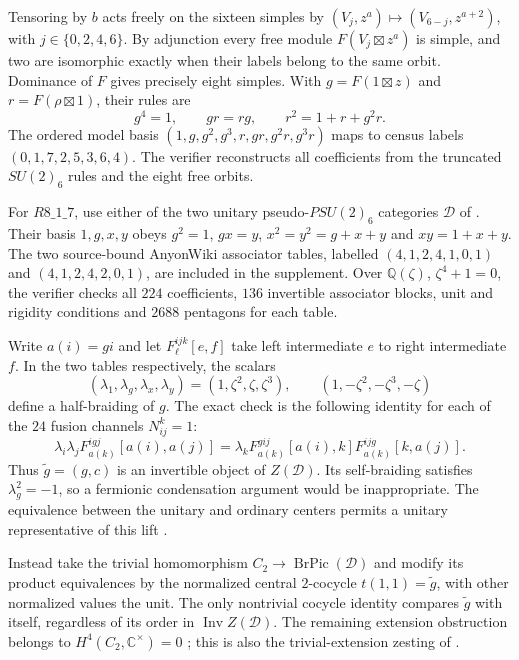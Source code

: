 \documentclass[11pt,reqno]{amsart}
\theoremstyle{definition}
\theoremstyle{remark}
\newcommand{\C}{\mathbb C}
\newcommand{\Q}{\mathbb Q}
\begin{document}
Tensoring by $b$ acts freely on the sixteen simples by $(V_j,z^a)\mapsto(V_{6-j},z^{a+2})$, with $j\in\{0,2,4,6\}$. By adjunction every free module $F(V_j\boxtimes z^a)$ is simple, and two are isomorphic exactly when their labels belong to the same orbit. Dominance of $F$ gives precisely eight simples. With $g=F(1\boxtimes z)$ and $r=F(\rho\boxtimes1)$, their rules are
\[
g^4=1,\qquad gr=rg,\qquad r^2=1+r+g^2r.
\]
The ordered model basis $(1,g,g^2,g^3,r,gr,g^2r,g^3r)$ maps to census labels $(0,1,7,2,5,3,6,4)$. The verifier reconstructs all coefficients from the truncated $SU(2)_6$ rules and the eight free orbits.


For $R8\_1\_7$, use either of the two unitary pseudo-$PSU(2)_6$ categories $\mathcal D$ of \cite[Theorem~4.1]{EIP}. Their basis $1,g,x,y$ obeys $g^2=1$, $gx=y$, $x^2=y^2=g+x+y$ and $xy=1+x+y$. The two source-bound AnyonWiki associator tables, labelled $(4,1,2,4,1,0,1)$ and $(4,1,2,4,2,0,1)$, are included in the supplement. Over $\Q(\zeta)$, $\zeta^4+1=0$, the verifier checks all $224$ coefficients, $136$ invertible associator blocks, unit and rigidity conditions and $2688$ pentagons for each table.

Write $a(i)=gi$ and let $F^{ijk}_\ell[e,f]$ take left intermediate $e$ to right intermediate $f$. In the two tables respectively, the scalars
\[
(\lambda_1,\lambda_g,\lambda_x,\lambda_y)
=(1,\zeta^2,\zeta,\zeta^3),\qquad
(1,-\zeta^2,-\zeta^3,-\zeta)
\]
define a half-braiding of $g$. The exact check is the following identity for each of the $24$ fusion channels $N_{ij}^k=1$:
\[
\lambda_i\lambda_j F^{igj}_{a(k)}[a(i),a(j)]
=\lambda_k F^{gij}_{a(k)}[a(i),k]F^{ijg}_{a(k)}[k,a(j)].
\]
Thus $\widetilde g=(g,c)$ is an invertible object of $Z(\mathcal D)$. Its self-braiding satisfies $\lambda_g^2=-1$, so a fermionic condensation argument would be inappropriate. The equivalence between the unitary and ordinary centers permits a unitary representative of this lift \cite[corrected Remark~3.1]{GalindoUnitary}.

Instead take the trivial homomorphism $C_2\to\operatorname{BrPic}(\mathcal D)$ and modify its product equivalences by the normalized central $2$-cocycle $t(1,1)=\widetilde g$, with other normalized values the unit. The only nontrivial cocycle identity compares $\widetilde g$ with itself, regardless of its order in $\operatorname{Inv}Z(\mathcal D)$. The remaining extension obstruction belongs to $H^4(C_2,\C^\times)=0$ \cite[Theorem~1.3]{ENOExt}; this is also the trivial-extension zesting of \cite[Section~6.2]{JMPP}.
\end{document}
